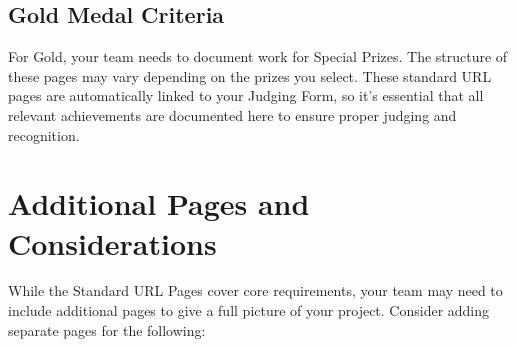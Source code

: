\subsection*{Gold Medal Criteria} 
For Gold, your team needs to document work for Special Prizes.
The structure of these pages may vary depending on the prizes you select. \newline
These standard URL pages are automatically linked to your Judging Form, so it’s essential that all relevant achievements are documented here to ensure proper judging and recognition.

\section{Additional Pages and Considerations}

While the Standard URL Pages cover core requirements, your team may need to include additional pages to give a full picture of your project.
Consider adding separate pages for the following:

